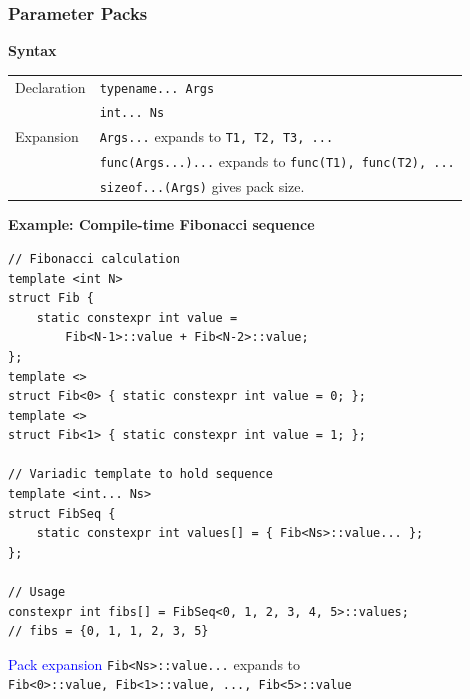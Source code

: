 \subsubsection{Parameter Packs}

\textbf{Syntax}\\
\begin{tabularx}{\linewidth}{lX}
    \hline
    Declaration & \texttt{typename... Args}\\
                & \texttt{int... Ns}\\
    \hline
    Expansion & \texttt{Args...} expands to \texttt{T1, T2, T3, ...}\\
              & \texttt{func(Args...)...} expands to \texttt{func(T1), func(T2), ...}\\
              & \texttt{sizeof...(Args)} gives pack size.\\
    \hline
\end{tabularx}

\textbf{Example: Compile-time Fibonacci sequence}

\begin{mdframed}[nobreak=true,backgroundcolor=gray!10,linecolor=Firebrick4]
\begin{verbatim}
// Fibonacci calculation
template <int N>
struct Fib {
    static constexpr int value =
        Fib<N-1>::value + Fib<N-2>::value;
};
template <>
struct Fib<0> { static constexpr int value = 0; };
template <> 
struct Fib<1> { static constexpr int value = 1; };

// Variadic template to hold sequence
template <int... Ns>
struct FibSeq {
    static constexpr int values[] = { Fib<Ns>::value... };
};

// Usage
constexpr int fibs[] = FibSeq<0, 1, 2, 3, 4, 5>::values;
// fibs = {0, 1, 1, 2, 3, 5}
\end{verbatim}
\end{mdframed}

\textcolor{blue}{Pack expansion} \texttt{Fib<Ns>::value...} expands to\\
\texttt{Fib<0>::value, Fib<1>::value, ..., Fib<5>::value}

